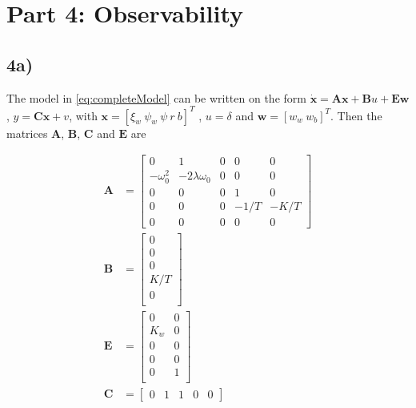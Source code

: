 
\section{Part 4: Observability}

\subsection{4a)} \label{subsec:4a}

The model in \cref{eq:completeModel} can be written on the form $\mathbf{\dot x} = \mathbf{A} \mathbf{x} + \mathbf{B}u + \mathbf{E}\mathbf{w}$, $ y = \mathbf{C}\mathbf{x} + v$, with $\mathbf{x} = [ \xi_w\ \psi_w\ \psi\ r\ b]^ T $ , $ u = \delta $ and $ \mathbf{w} = [w_w\ w_b]^T$. Then the matrices $\mathbf{A}$, $\mathbf{B}$, $\mathbf{C}$ and $\mathbf{E}$ are

\begin{subequations}
    \begin{align}
        \mathbf{A} &= \begin{bmatrix}
        0 & 1 & 0 & 0 & 0 \\
        -\omega_0^2 & -2\lambda\omega_0 & 0 & 0 & 0 \\
        0 & 0 & 0 & 1 & 0 \\
        0 & 0 & 0 & -1/T & -K/T \\
        0 & 0 & 0 & 0 & 0
        \end{bmatrix} \\
        \mathbf{B} &= \begin{bmatrix}
        0 \\
        0 \\
        0 \\
        K/T \\
        0 \\
        \end{bmatrix} \\
        \mathbf{E} &= \begin{bmatrix}
        0 & 0 \\
        K_w & 0 \\
        0 & 0 \\
        0 & 0 \\
        0 & 1 \\
        \end{bmatrix} \\
        \mathbf{C} &= \begin{bmatrix}
        0 & 1 & 1 & 0 & 0
        \end{bmatrix}
    \end{align}
\end{subequations}

